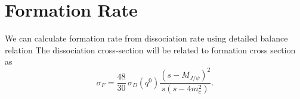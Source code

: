 \documentclass[aps,prc,preprint,superscriptaddress,showpacs,showkeys]{revtex4-1}
\begin{document}





\section{Formation Rate}
We can calculate formation rate from dissociation rate using detailed balance relation \cite{THEWF} 
The dissociation cross-section will be related to formation cross section as
\begin{equation}
\sigma_{F} = \frac{48}{30}\,\sigma_{D}(q^0)\frac{(s-M_{J/\psi})^{2}}{s(s-4m_{c}^{2})}.
\end{equation}
\end{document}
